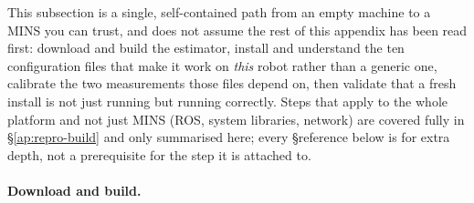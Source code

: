 This subsection is a single, self-contained path from an empty machine to a
MINS you can trust, and does not assume the rest of this appendix has been
read first: download and build the estimator, install and understand the ten
configuration files that make it work on \emph{this} robot rather than a
generic one, calibrate the two measurements those files depend on, then
validate that a fresh install is not just running but running correctly.
Steps that apply to the whole platform and not just MINS (ROS, system
libraries, network) are covered fully in \S\ref{ap:repro-build} and only
summarised here; every \S reference below is for extra depth, not a
prerequisite for the step it is attached to.

\paragraph{Download and build.}
